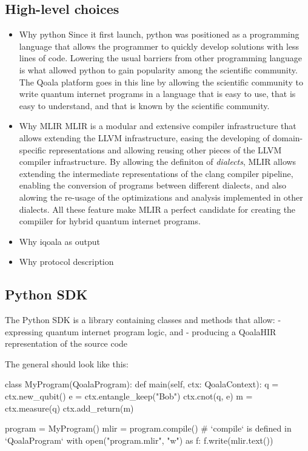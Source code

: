 \subsection{High-level choices}
\begin{itemize}
\item Why python
  Since it first launch, python was positioned as a programming language that allows the programmer to quickly develop
  solutions with less lines of code. Lowering the usual barriers from other programming language is what allowed python
  to gain popularity among the scientific community.
  The Qoala platform goes in this line by allowing the scientific community to write quantum internet programs in a
  language that is easy to use, that is easy to understand, and that is known by the scientific community.
\item Why MLIR
  MLIR is a modular and extensive compiler infrastructure that allows extending the LLVM infrastructure, easing the
  developing of domain-specific representations and allowing reusing other pieces of the LLVM compiler infrastructure.
  By allowing the definiton of \textit{dialects}, MLIR allows extending the intermediate representations of the clang compiler
  pipeline, enabling the conversion of programs between different dialects, and also alowing the re-usage of the
  optimizations and analysis implemented in other dialects.
  All these feature make MLIR a perfect candidate for creating the compiiler for hybrid quantum internet programs.
\item Why iqoala as output
\item Why protocol description
\end{itemize}
    

\subsection{Python SDK}
The Python SDK is a library containing classes and methods that allow:
- expressing quantum internet program logic, and
- producing a QoalaHIR representation of the source code

The general should look like this:

\begin{pycode}
class MyProgram(QoalaProgram):
    def main(self, ctx: QoalaContext):
        q = ctx.new_qubit()
        e = ctx.entangle_keep("Bob")
        ctx.cnot(q, e)
        m = ctx.measure(q)
        ctx.add_return(m)

program = MyProgram()
mlir = program.compile()  # `compile` is defined in `QoalaProgram`
with open("program.mlir", "w") as f:
    f.write(mlir.text())
\end{pycode}

